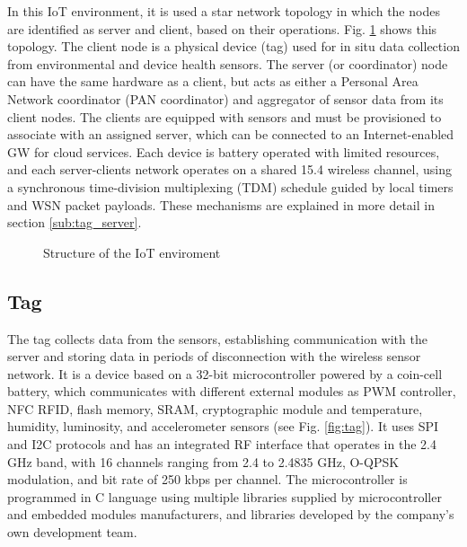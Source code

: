 \documentclass[journal]{IEEEtran}	%
\begin{document}
In this IoT environment, it is used a star network topology in which the nodes are identified as server and client, based on their operations. Fig. \ref{fig:topology} shows this topology. The client node is a physical device (tag) used for in situ data collection from environmental and device health sensors. The server (or coordinator) node can have the same hardware as a client, but acts as either a Personal Area Network coordinator (PAN coordinator) and aggregator of sensor data from its client nodes. The clients are equipped with sensors and must be provisioned to associate with an assigned server, which can be connected to an Internet-enabled GW for cloud services. Each device is battery operated with limited resources, and each server-clients network operates on a shared 15.4 wireless channel, using a synchronous time-division multiplexing (TDM) schedule guided by local timers and WSN packet payloads. These mechanisms are explained in more detail in section \ref{sub:tag_server}.

\begin{figure}[t!]
    \centering
    \caption{Structure of the IoT enviroment}
    \label{fig:topology}
\end{figure}


\subsection{Tag}


The tag collects data from the sensors, establishing communication with the server and storing data in periods of disconnection with the wireless sensor network. It is a device based on a 32-bit microcontroller powered by a coin-cell battery, which communicates with different external modules as PWM controller, NFC RFID, flash memory, SRAM, cryptographic module and temperature, humidity, luminosity, and accelerometer sensors (see Fig. \ref{fig:tag}). It uses SPI and I2C protocols and has an integrated RF interface that operates in the 2.4 GHz band, with 16 channels ranging from 2.4 to 2.4835 GHz, O-QPSK modulation, and bit rate of 250 kbps per channel. The microcontroller is programmed in C language using multiple libraries supplied by microcontroller and embedded modules manufacturers, and libraries developed by the company's own development team.
\end{document}
